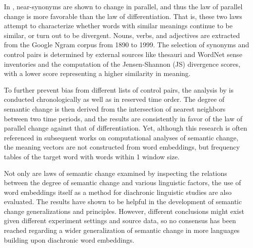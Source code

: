 In \textcite{xu2015computational}, near-synonyms are shown to change in parallel, and thus the law of parallel change is more favorable than the law of differentiation. That is, these two laws attempt to characterize whether words with similar meanings continue to be similar, or turn out to be divergent. Nouns, verbs, and adjectives are extracted from the Google Ngram corpus from 1890 to 1999. The selection of synonyms and control pairs is determined by external sources like thesauri and WordNet sense inventories and the computation of the Jensen-Shannon (JS) divergence scores, with a lower score representing a higher similarity in meaning.

To further prevent bias from different lists of control pairs, the analysis by \textcite{xu2015computational} is conducted chronologically as well as in reserved time order. The degree of semantic change is then derived from the intersection of nearest neighbors between two time periods, and the results are consistently in favor of the law of parallel change against that of differentiation. Yet, although this research is often referenced in subsequent works on computational analyses of semantic change, the meaning vectors are not constructed from word embeddings, but frequency tables of the target word with words within 1 window size.

Not only are laws of semantic change examined by inspecting the relations between the degree of semantic change and various linguistic factors, the use of word embeddings itself as a method for diachronic linguistic studies are also evaluated. The results have shown to be helpful in the development of semantic change generalizations and principles. However, different conclusions might exist given different experiment settings and source data, so no consensus has been reached regarding a wider generalization of semantic change in more languages building upon diachronic word embeddings.



